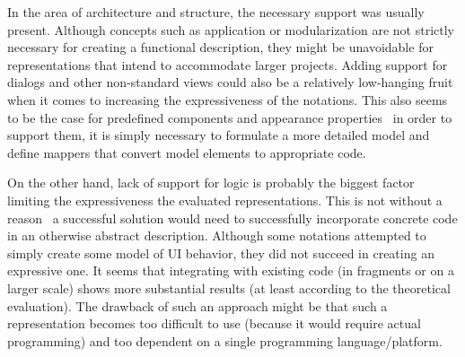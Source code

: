In the area of architecture and structure, the necessary support was usually present.
Although concepts such as application or modularization are not strictly necessary for creating a functional description, they might be unavoidable for representations that intend to accommodate larger projects.
Adding support for dialogs and other non-standard views could also be a relatively low-hanging fruit when it comes to increasing the expressiveness of the notations.
This also seems to be the case for predefined components and appearance properties \textendash\ in order to support them, it is simply necessary to formulate a more detailed model and define mappers that convert model elements to appropriate code.

On the other hand, lack of support for logic is probably the biggest factor limiting the expressiveness the evaluated representations.
This is not without a reason \textendash\ a successful solution would need to successfully incorporate concrete code in an otherwise abstract description.
Although some notations attempted to simply create some model of UI behavior, they did not succeed in creating an expressive one.
It seems that integrating with existing code (in fragments or on a larger scale) shows more substantial results (at least according to the theoretical evaluation).
The drawback of such an approach might be that such a representation becomes too difficult to use (because it would require actual programming) and too dependent on a single programming language/platform.

